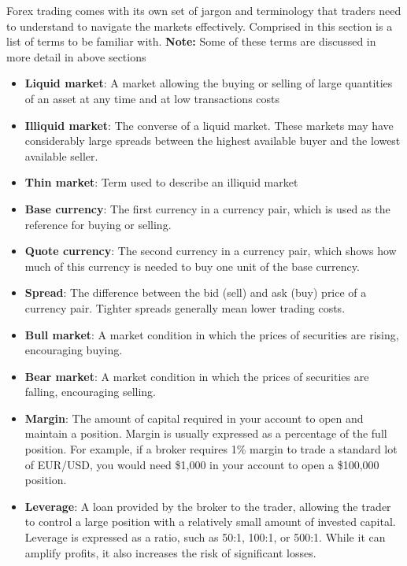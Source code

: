 \documentclass{report}
\begin{document}
     \pagebreak 
     \bigbreak \noindent 
     Forex trading comes with its own set of jargon and terminology that traders need to understand to navigate the markets effectively. Comprised in this section is a list of terms to be familiar with.
     \bigbreak \noindent 
     \textbf{Note:} Some of these terms are discussed in more detail in above sections
     \bigbreak \noindent 
     \begin{itemize}
         \item \textbf{Liquid market}: A market allowing the buying or selling of large quantities of an asset at any time and at low transactions costs
         \item \textbf{Illiquid market}: The converse of a liquid market. These markets may have considerably large spreads between the highest available buyer and the lowest available seller.
         \item \textbf{Thin market}: Term used to describe an illiquid market
         \item \textbf{Base currency}: The first currency in a currency pair, which is used as the reference for buying or selling.
         \item \textbf{Quote currency}: The second currency in a currency pair, which shows how much of this currency is needed to buy one unit of the base currency.
         \item \textbf{Spread}: The difference between the bid (sell) and ask (buy) price of a currency pair. Tighter spreads generally mean lower trading costs.
         \item \textbf{Bull market}: A market condition in which the prices of securities are rising, encouraging buying.
         \item \textbf{Bear market}: A market condition in which the prices of securities are falling, encouraging selling.
         \item \textbf{Margin}: The amount of capital required in your account to open and maintain a position. Margin is usually expressed as a percentage of the full position. For example, if a broker requires 1\% margin to trade a standard lot of EUR/USD, you would need \$1,000 in your account to open a \$100,000 position.
         \item \textbf{Leverage}: A loan provided by the broker to the trader, allowing the trader to control a large position with a relatively small amount of invested capital. Leverage is expressed as a ratio, such as 50:1, 100:1, or 500:1. While it can amplify profits, it also increases the risk of significant losses.

\end{itemize}
\end{document}
